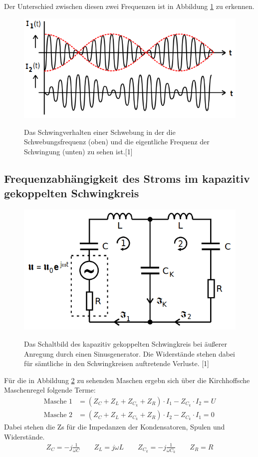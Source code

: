 \documentclass[titlepage = firstcover]{scrartcl}
\begin{document}
        Der Unterschied zwischen diesen zwei Frequenzen ist in Abbildung \ref{fig:Schwebung} zu erkennen.
        \begin{figure}[h]
            \centering
            \caption{Das Schwingverhalten einer Schwebung in der die Schwebungsfrequenz (oben) und die eigentliche Frequenz der Schwingung (unten) zu sehen ist.[1]}
            \includegraphics[width = 0.4\linewidth]{Schwebung.png}
            \label{fig:Schwebung}
        \end{figure}

    \subsection{Frequenzabhängigkeit des Stroms im kapazitiv gekoppelten Schwingkreis}
        \begin{figure}[h]
            \centering
            \caption{Das Schaltbild des kapazitiv gekoppelten Schwingkreis bei äußerer Anregung durch einen Sinusgenerator. Die Widerstände stehen dabei für sämtliche in den Schwingkreisen auftretende Verluste. [1] }
            \includegraphics[width = 0.4\linewidth]{Strom.png}
            \label{fig:Strom}
        \end{figure}
        Für die in Abbildung \ref{fig:Strom} zu sehenden Maschen ergebn sich über die Kirchhoffsche Maschenregel folgende Terme:
        \begin{align}
            \text{Masche 1} &= (Z_C + Z_L + Z_{C_k} + Z_R) \cdot I_1 - Z_{C_k} \cdot I_2 = U \\
            \text{Masche 2} &= (Z_C + Z_L + Z_{C_k} + Z_R) \cdot I_2 - Z_{C_k} \cdot I_1 = 0 
            \label{eqn:Mascheangeregt}
        \end{align}
        Dabei stehen die Zs für die Impedanzen der Kondensatoren, Spulen und Widerstände.
        \begin{align*}
            Z_C = -j\frac{1}{\omega C} \qquad Z_L= j\omega L \qquad  Z_{C_k} = -j\frac{1}{\omega C_k} \qquad Z_R = R \\
        \end{align*}
\end{document}
